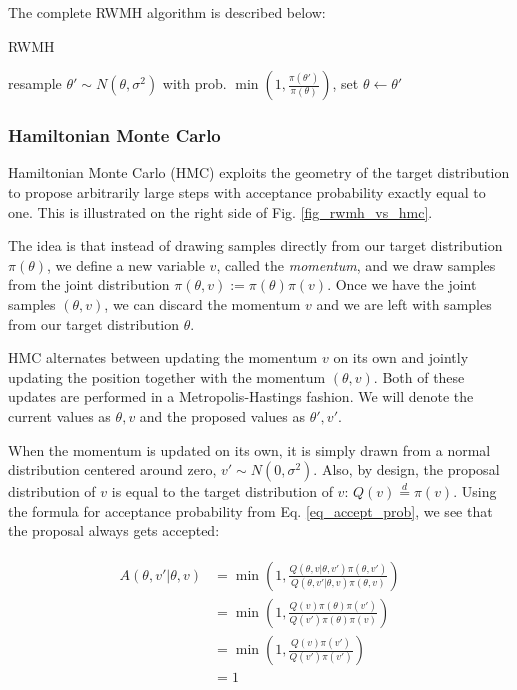 \documentclass[12pt]{article}
\begin{document}
{The complete RWMH algorithm is described below:
\begin{algorithm}
\caption{RWMH}
\label{alg_rwmh}
\begin{algorithmic}
 
	\State resample $\theta' \sim N(\theta, \sigma^2)$ 
	\State with prob. $\min{(1, \frac{\pi(\theta')}{\pi(\theta)})}$, set $\theta \gets \theta'$ 
\EndFor
\end{algorithmic}
\end{algorithm}

\subsubsection{Hamiltonian Monte Carlo}

Hamiltonian Monte Carlo (HMC) exploits the geometry of the target distribution to propose arbitrarily large steps with acceptance probability exactly equal to one. \cite{hmc} This is illustrated on the right side of Fig. \ref{fig_rwmh_vs_hmc}.

The idea is that instead of drawing samples directly from our target distribution $\pi(\theta)$, we define a new variable $v$, called the \textit{momentum}, and we draw samples from the joint distribution $\pi(\theta, v) := \pi(\theta)\pi(v)$. Once we have the joint samples $(\theta, v)$, we can discard the momentum $v$ and we are left with samples from our target distribution $\theta$.

HMC alternates between updating the momentum $v$ on its own and jointly updating the position together with the momentum $(\theta, v)$. Both of these updates are performed in a Metropolis-Hastings fashion. We will denote the current values as $\theta, v$ and the proposed values as $\theta', v'$.

When the momentum is updated on its own, it is simply drawn from a normal distribution centered around zero, $v' \sim N(0, \sigma^2)$. Also, by design, the proposal distribution of $v$ is equal to the target distribution of $v$: $Q(v) \overset{d}{=} \pi(v)$. Using the formula for acceptance probability from Eq. \ref{eq_accept_prob}, we see that the proposal always gets accepted:

\begin{align}
\begin{split}
A(\theta,v'|\theta,v) &= \min \left(1, \frac{Q(\theta,v|\theta,v')\pi(\theta,v')}{Q(\theta,v'|\theta,v)\pi(\theta,v)} \right) \\
&= \min \left(1, \frac{Q(v)\pi(\theta)\pi(v')}{Q(v')\pi(\theta)\pi(v)} \right) \\
&= \min \left(1, \frac{Q(v)\pi(v')}{Q(v')\pi(v')} \right) \\
&= 1
\end{split}
\end{align}

}
\end{document}
